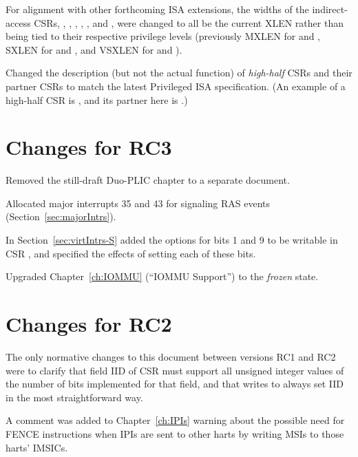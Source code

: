 For alignment with other forthcoming {\RISCV} ISA extensions,
the widths of the indirect-access CSRs, , ,
, , , and , were
changed to all be the current XLEN rather than being tied to
their respective privilege levels (previously MXLEN for
 and , SXLEN for  and ,
and VSXLEN for  and ).

Changed the description (but not the actual function)
of \emph{high-half} CSRs and their partner CSRs
to match the latest {\RISCV} Privileged ISA specification.
(An example of a high-half CSR is ,
and its partner here is .)

\section*{Changes for RC3}

Removed the still-draft Duo-PLIC chapter to a separate document.

Allocated major interrupts 35 and 43 for signaling RAS events
(Section~\ref{sec:majorIntrs}).

In Section~\ref{sec:virtIntrs-S} added the options
for bits 1 and 9 to be writable in CSR ,
and specified the effects of setting each of these bits.

Upgraded Chapter~\ref{ch:IOMMU} (``IOMMU Support'')
to the \emph{frozen} state.

\section*{Changes for RC2}

The only normative changes to this document
between versions RC1 and RC2 were to clarify that
field IID of CSR  must support all
unsigned integer values of the number of bits implemented
for that field, and that writes to 
always set IID in the most straightforward way.

A comment was added to Chapter~\ref{ch:IPIs} warning about
the possible need for FENCE instructions when IPIs are
sent to other harts by writing MSIs to those harts' IMSICs.

